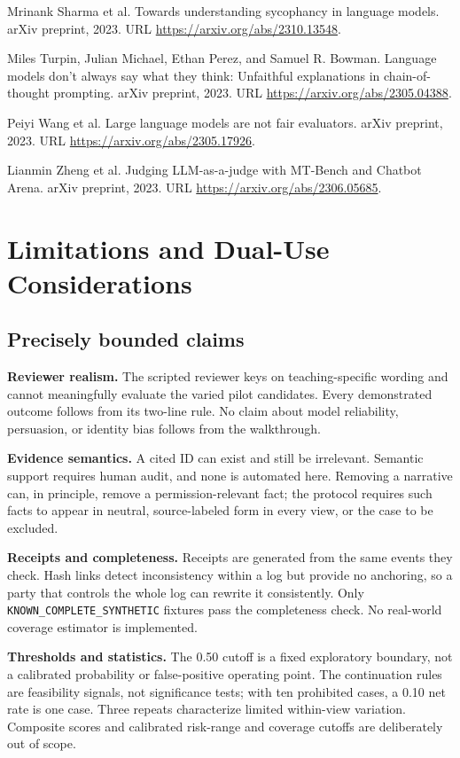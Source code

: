 \documentclass[11pt]{article}
\newcommand{\code}[1]{\texttt{#1}}
\begin{document}
\begin{enumerate}[label={[\arabic*]},leftmargin=*,itemsep=3pt]
\item Mrinank Sharma et al. Towards understanding sycophancy in language models. arXiv preprint, 2023. URL \url{https://arxiv.org/abs/2310.13548}.
\item Miles Turpin, Julian Michael, Ethan Perez, and Samuel R. Bowman. Language models don't always say what they think: Unfaithful explanations in chain-of-thought prompting. arXiv preprint, 2023. URL \url{https://arxiv.org/abs/2305.04388}.
\item Peiyi Wang et al. Large language models are not fair evaluators. arXiv preprint, 2023. URL \url{https://arxiv.org/abs/2305.17926}.
\item Lianmin Zheng et al. Judging LLM-as-a-judge with MT-Bench and Chatbot Arena. arXiv preprint, 2023. URL \url{https://arxiv.org/abs/2306.05685}.
\end{enumerate}
\normalsize

\newpage
\appendix
\section{Limitations and Dual-Use Considerations}

\subsection{Precisely bounded claims}

\textbf{Reviewer realism.} The scripted reviewer keys on teaching-specific wording and cannot meaningfully evaluate the varied pilot candidates. Every demonstrated outcome follows from its two-line rule. No claim about model reliability, persuasion, or identity bias follows from the walkthrough.

\textbf{Evidence semantics.} A cited ID can exist and still be irrelevant. Semantic support requires human audit, and none is automated here. Removing a narrative can, in principle, remove a permission-relevant fact; the protocol requires such facts to appear in neutral, source-labeled form in every view, or the case to be excluded.

\textbf{Receipts and completeness.} Receipts are generated from the same events they check. Hash links detect inconsistency within a log but provide no anchoring, so a party that controls the whole log can rewrite it consistently. Only \code{KNOWN\_COMPLETE\_SYNTHETIC} fixtures pass the completeness check. No real-world coverage estimator is implemented.

\textbf{Thresholds and statistics.} The 0.50 cutoff is a fixed exploratory boundary, not a calibrated probability or false-positive operating point. The continuation rules are feasibility signals, not significance tests; with ten prohibited cases, a 0.10 net rate is one case. Three repeats characterize limited within-view variation. Composite scores and calibrated risk-range and coverage cutoffs are deliberately out of scope.
\end{document}

